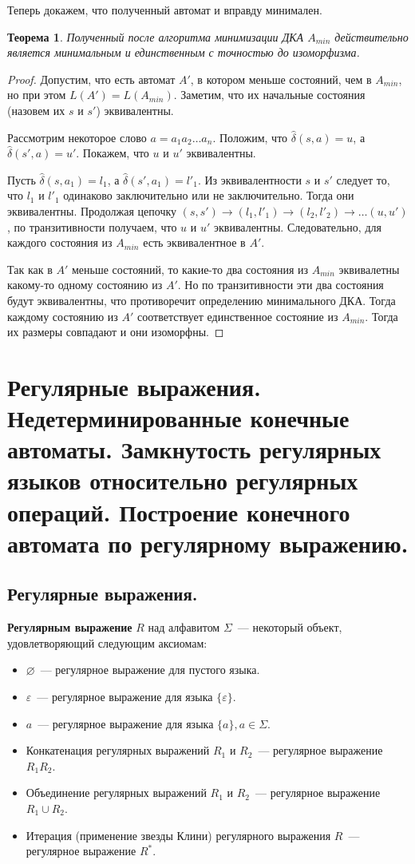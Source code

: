 \documentclass[a4paper,12pt]{article}
\newtheorem*{theorem}{Теорема}
\begin{document}
	Теперь докажем, что полученный автомат и вправду минимален.
	
	\begin{theorem}
		Полученный после алгоритма минимизации ДКА \(A_{min}\) действительно является минимальным и единственным с точностью до изоморфизма.
	\end{theorem}
	\begin{proof}
		Допустим, что есть автомат \(A'\), в котором меньше состояний, чем в \(A_{min}\), но при этом \(L(A') = L(A_{min})\). Заметим, что их начальные состояния (назовем их \(s\) и \(s'\)) эквивалентны.
		
		Рассмотрим некоторое слово \(a = a_1 a_2 \ldots a_n\). Положим, что \(\hat{\delta}(s, a) = u\), а  \(\hat{\delta}(s', a) = u'\). Покажем, что \(u\) и \(u'\) эквивалентны.
		
		Пусть  \(\hat{\delta}(s, a_1) = l_1\), а  \(\hat{\delta}(s', a_1) = l'_1\). Из эквивалентности \(s\) и \(s'\) следует то, что \(l_1\) и  \(l'_1\) одинаково заключительно или не заключительно. Тогда они эквивалентны. Продолжая цепочку \((s, s') \to (l_1, l'_1) \to (l_2, l'_2) \to \ldots (u, u')\), по транзитивности получаем, что \(u\) и \(u'\) эквивалентны. Следовательно, для каждого состояния из \(A_{min}\) есть эквивалентное в \(A'\).
		
		Так как в \(A'\) меньше состояний, то какие-то два состояния из \(A_{min}\) эквивалетны какому-то одному состоянию из \(A'\). Но по транзитивности эти два состояния будут эквивалентны, что противоречит определению минимального ДКА. Тогда каждому состоянию из \(A'\) соответствует единственное состояние из \(A_{min}\). Тогда их размеры совпадают и они изоморфны.
	\end{proof}
\newpage
\section{Регулярные выражения. Недетерминированные конечные автоматы. Замкнутость регулярных языков относительно регулярных операций. Построение конечного автомата по регулярному выражению.}
	\subsection{Регулярные выражения.}
	\textbf{Регулярным выражение} \(R\) над алфавитом \(\Sigma\)~--- некоторый объект, удовлетворяющий следующим аксиомам:
	\begin{itemize}
		\item \(\varnothing\)~--- регулярное выражение для пустого языка.
		\item \(\varepsilon\)~--- регулярное выражение для языка \(\{\varepsilon\}\).
		\item \(a\)~--- регулярное выражение для языка \(\{a\}, a \in \Sigma\).
		\item Конкатенация регулярных выражений \(R_1\) и \(R_2\)~--- регулярное выражение \(R_1R_2\).
		\item Объединение регулярных выражений \(R_1\) и \(R_2\)~--- регулярное выражение \(R_1 \cup R_2\).
		\item Итерация (применение звезды Клини) регулярного выражения \(R\)~--- регулярное выражение \(R^*\).
	\end{itemize} 
\end{document}
